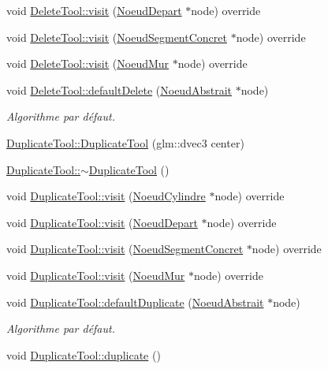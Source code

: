 \begin{DoxyCompactItemize}
\item 
void \hyperlink{group__inf2990_ga9efc126da05a809724a3a2597ac4cb57}{Delete\+Tool\+::visit} (\hyperlink{class_noeud_depart}{Noeud\+Depart} $\ast$node) override
\item 
void \hyperlink{group__inf2990_ga1908b4ee57bb2dfbf4022412b48470d8}{Delete\+Tool\+::visit} (\hyperlink{class_noeud_segment_concret}{Noeud\+Segment\+Concret} $\ast$node) override
\item 
void \hyperlink{group__inf2990_ga816147276bc393b0552e031441541726}{Delete\+Tool\+::visit} (\hyperlink{class_noeud_mur}{Noeud\+Mur} $\ast$node) override
\item 
void \hyperlink{group__inf2990_gab16541bc54ef7e060c56d59d64798805}{Delete\+Tool\+::default\+Delete} (\hyperlink{class_noeud_abstrait}{Noeud\+Abstrait} $\ast$node)
\begin{DoxyCompactList}\small\item\em Algorithme par défaut. \end{DoxyCompactList}\item 
\hyperlink{group__inf2990_ga13dd0524e005f4a44dbaeea9f237d761}{Duplicate\+Tool\+::\+Duplicate\+Tool} (glm\+::dvec3 center)
\item 
\hyperlink{group__inf2990_gaab141bc62b424e5e0bfc48bd899bcb8a}{Duplicate\+Tool\+::$\sim$\+Duplicate\+Tool} ()
\item 
void \hyperlink{group__inf2990_gab91de27487440694048c1a0fbcc74da7}{Duplicate\+Tool\+::visit} (\hyperlink{class_noeud_cylindre}{Noeud\+Cylindre} $\ast$node) override
\item 
void \hyperlink{group__inf2990_ga5fa8bbf01a90c95062c8104ebdf5bb62}{Duplicate\+Tool\+::visit} (\hyperlink{class_noeud_depart}{Noeud\+Depart} $\ast$node) override
\item 
void \hyperlink{group__inf2990_gaa8f5663adbfe6f00a2c2f79083339e30}{Duplicate\+Tool\+::visit} (\hyperlink{class_noeud_segment_concret}{Noeud\+Segment\+Concret} $\ast$node) override
\item 
void \hyperlink{group__inf2990_ga9b9e4456490e59603f3d8924fdf19c18}{Duplicate\+Tool\+::visit} (\hyperlink{class_noeud_mur}{Noeud\+Mur} $\ast$node) override
\item 
void \hyperlink{group__inf2990_ga4708caab32b10170d24dba25d4829677}{Duplicate\+Tool\+::default\+Duplicate} (\hyperlink{class_noeud_abstrait}{Noeud\+Abstrait} $\ast$node)
\begin{DoxyCompactList}\small\item\em Algorithme par défaut. \end{DoxyCompactList}\item 
\hypertarget{group__inf2990_gadbe76417e934ddabc6df18141162fe2c}{}void \hyperlink{group__inf2990_gadbe76417e934ddabc6df18141162fe2c}{Duplicate\+Tool\+::duplicate} ()\label{group__inf2990_gadbe76417e934ddabc6df18141162fe2c}


\end{DoxyCompactItemize}
